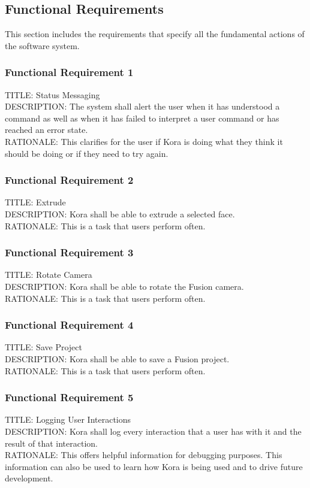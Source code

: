\documentclass[onecolumn, draftclsnofoot,10pt, compsoc]{IEEEtran}
\def \botname{Kora\xspace}
\begin{document}
    \subsection{Functional Requirements}
    This section includes the requirements that specify all the fundamental actions of the software system.
        \subsubsection{Functional Requirement 1}
        TITLE: Status Messaging \\
        DESCRIPTION: The system shall alert the user when it has understood a command as well as when it has failed to interpret a user command or has reached an error state. \\
        RATIONALE: This clarifies for the user if \botname is doing what they think it should be doing or if they need to try again. 
        
        \subsubsection{Functional Requirement 2}
        TITLE: Extrude \\
        DESCRIPTION: \botname shall be able to extrude a selected face. \\
        RATIONALE: This is a task that users perform often.
        
        \subsubsection{Functional Requirement 3}
        TITLE: Rotate Camera \\
        DESCRIPTION: \botname shall be able to rotate the Fusion camera. \\
        RATIONALE: This is a task that users perform often.
        
        \subsubsection{Functional Requirement 4}
        TITLE: Save Project \\
        DESCRIPTION: \botname shall be able to save a Fusion project. \\
        RATIONALE: This is a task that users perform often.
        
        \subsubsection{Functional Requirement 5}
        TITLE: Logging User Interactions \\
        DESCRIPTION: \botname shall log every interaction that a user has with it and the result of that interaction. \\
        RATIONALE: This offers helpful information for debugging purposes. This information can also be used to learn how \botname is being used and to drive future development.
       
\end{document}
